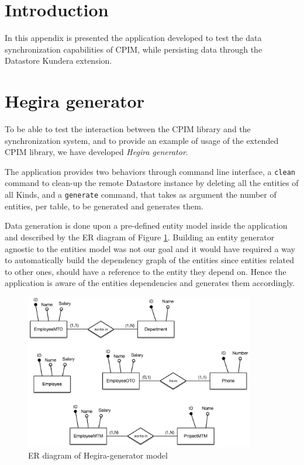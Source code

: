 \section{Introduction}
In this appendix is presented the application developed to test the data synchronization capabilities of CPIM, while persisting data through the Datastore Kundera extension. 

\section{Hegira generator}
\label{sec:hegira-generator}
To be able to test the interaction between the CPIM library and the synchronization system, and to provide an example of usage of the extended CPIM library, we have developed \textit{Hegira generator}.

\noindent The application provides two behaviors through command line interface, a \texttt{clean} command to clean-up the remote Datastore instance by deleting all the entities of all Kinds, and a \texttt{generate} command, that takes as argument the number of entities, per table, to be generated and generates them.

\newparagraph Data generation is done upon a pre-defined entity model inside the application and described by the ER diagram of Figure \ref{fig:hegira-generator-er}.
Building an entity generator agnostic to the entities model was not our goal and it would have required a way to automatically build the dependency graph of the entities since entities related to other ones, should have a reference to the entity they depend on. Hence the application is aware of the entities dependencies and generates them accordingly.

\begin{figure}[tbh]
  \centering
  \includegraphics[width=10cm]{images/hegira_generator_er}
  \caption{ER diagram of Hegira-generator model}
  \label{fig:hegira-generator-er}
\end{figure} 

